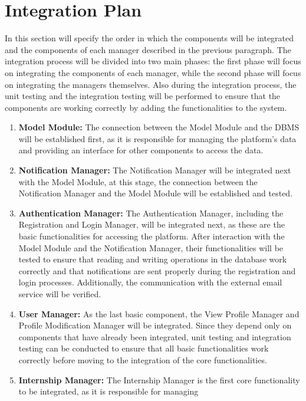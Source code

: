 \section{Integration Plan}\label{sec:integration-plan}
In this section will specify the order in which the components will be integrated and the components of each manager described in the
previous paragraph. The integration process will be divided into two main phases: the first phase will focus on integrating the components
of each manager, while the second phase will focus on integrating the managers themselves. Also during the integration process, the
unit testing and the integration testing will be performed to ensure that the components are working correctly by adding the functionalities
to the system.
\begin{enumerate}
    \item \textbf{Model Module:} The connection between the Model Module and the DBMS will be established first, as it is responsible for 
    managing the platform's data and providing an interface for other components to access the data.
    \item \textbf{Notification Manager:} The Notification Manager will be integrated next with the Model Module, at this stage, the connection
    between the Notification Manager and the Model Module will be established and tested.
    \item \textbf{Authentication Manager:} The Authentication Manager, including the Registration and Login Manager, will be integrated next, 
    as these are the basic functionalities for accessing the platform. After interaction with the Model Module and the Notification Manager, 
    their functionalities will be tested to ensure that reading and writing operations in the database work correctly and that notifications 
    are sent properly during the registration and login processes. Additionally, the communication with the external email service will be verified. 
    \item \textbf{User Manager:} As the last basic component, the View Profile Manager and Profile Modification Manager will be integrated. 
    Since they depend only on components that have already been integrated, unit testing and integration testing can be conducted to ensure that 
    all basic functionalities work correctly before moving to the integration of the core functionalities.
    \item \textbf{Internship Manager:} The Internship Manager is the first core functionality to be integrated, as it is responsible for managing 

\end{enumerate}
